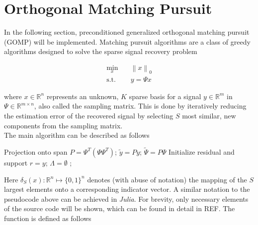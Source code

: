 \section{Orthogonal Matching Pursuit}
\label{JM:sec:GOMP}

In the following section, preconditioned generalized orthogonal matching pursuit (GOMP) \cite{JMTongEtAl2020} will be implemented.
Matching pursuit algorithms are a class of greedy algorithms designed to solve the sparse signal recovery problem

\begin{equation}
\begin{aligned}
    \min_x \quad & \left\lVert x \right\rVert_0 \\
    \textrm{s.t.} \quad & y = \Psi x
\end{aligned}
\end{equation}

where $x \in \mathbb{R}^n$ represents an unknown, $K$ sparse basis for a signal $y \in \mathbb{R}^m$ in $\Psi \in \mathbb{R}^{m \times n}$, also called the sampling matrix.
This is done by iteratively reducing the estimation error of the recovered signal by selecting $S$ most similar, new components from the sampling matrix.\\

The main algorithm can be described as follows

\begin{algorithm}[H]
    \SetAlgoLined
    Projection onto span\; 
    $P = \Psi^T \left(\Psi\Psi^T\right)$;
    $\tilde{y} = P y$;
    $\tilde{\Psi} = P \Psi$\;
    Initialize residual and support\;
    $r = y$;
    $\Lambda = \emptyset$\;
    ;
\end{algorithm}

Here $\delta_S\left( x \right) : \mathbb{R}^n \mapsto \lbrace 0, 1 \rbrace^n$ denotes (with abuse of notation) the mapping of the $S$ largest elements onto a corresponding
indicator vector. A similar notation to the pseudocode above can be achieved in \textit{Julia}. For brevity, only necessary elements of the source code will be shown, which can be found in detail in REF. The function is defined as follows


